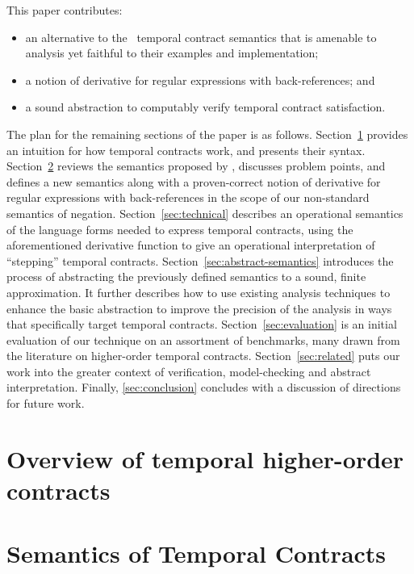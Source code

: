 This paper contributes:
\begin{itemize}
 \item{an alternative to the \dfm\
    temporal contract semantics that is amenable to analysis
   yet faithful to their examples and implementation;}
 \item{a notion of derivative for regular expressions with back-references; and}
 \item{a sound abstraction to computably verify temporal contract satisfaction.}
\end{itemize}
The plan for the remaining sections of the paper is as follows.
Section~\ref{sec:overview} provides an intuition for how temporal
  contracts work, and presents their syntax.
%
Section~\ref{sec:temporal-semantics} reviews the semantics proposed by
  \dfm, discusses problem points, and defines a new semantics along
  with a proven-correct notion of derivative for regular expressions
  with back-references in the scope of our non-standard semantics of
  negation.
%
Section~\ref{sec:technical} describes an operational semantics of the
  language forms needed to express temporal contracts, using the
  aforementioned derivative function to give an operational
  interpretation of ``stepping'' temporal contracts.
%
Section~\ref{sec:abstract-semantics} introduces the process of
  abstracting the previously defined semantics to a sound, finite
  approximation.
%
  It further describes how to use existing analysis techniques to enhance the basic abstraction to improve the precision of the analysis in ways that specifically target temporal contracts.
%
Section~\ref{sec:evaluation} is an initial evaluation of our technique on an assortment of benchmarks, many drawn from the literature on higher-order temporal contracts.
%
Section~\ref{sec:related} puts our work into the greater context of verification, model-checking and abstract interpretation.
%
Finally, \autoref{sec:conclusion} concludes with a discussion of directions for future work.
%

\section{Overview of temporal higher-order contracts}\label{sec:overview}


\section{Semantics of Temporal Contracts} \label{sec:temporal-semantics}

